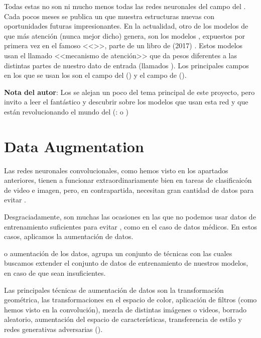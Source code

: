 Todas estas no son ni mucho menos todas las redes neuronales del campo del . Cada pocos meses se publica un  que muestra estructuras nuevas con oportunidades futuras impresionantes. En la actualidad, otro de los modelos de  que más atención (nunca mejor dicho) genera, son los modelos , expuestos por primera vez en el famoso  <<>>, parte de un libro de (2017) . Estos modelos usan el llamado <<mecanismo de atención>> que da pesos diferentes a las distintas partes de nuestro dato de entrada (llamados ). Los principales campos en los que se usan los  son el campo del  () y el campo de  ().

\textbf{Nota del autor}: Los  se alejan un poco del tema principal de este proyecto, pero invito a leer el fantástico  y descubrir sobre los modelos que usan esta red y que están revolucionando el mundo del  (\pe:  o )

\section{Data Augmentation}

Las redes neuronales convolucionales, como hemos visto en los apartados anteriores, tienen a funcionar
extraordinariamente bien en tareas de clasificaicón de video e imagen, pero, en contrapartida, necesitan gran cantidad de datos para evitar  .

Desgraciadamente, son muchas las ocasiones en las que no podemos usar datos de entrenamiento suficientes para evitar , como en el caso de datos médicos. En estos casos, aplicamos la aumentación de datos.

 o aumentación de los datos, agrupa un conjunto de técnicas con las cuales buscamos extender el conjunto de datos de entrenamiento de nuestros modelos, en caso de que sean insuficientes.

Las principales técnicas de aumentación de datos son la transformación geométrica, las transformaciones en el espacio de color, aplicación de filtros  (como hemos visto en la convolución), mezcla de distintas imágenes o videos, borrado aleatorio, aumentación del espacio de características, transferencia de estilo y redes generativas adversarias ().


